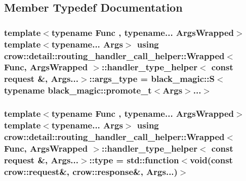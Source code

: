 \subsection{Member Typedef Documentation}
\hypertarget{structcrow_1_1detail_1_1routing__handler__call__helper_1_1_wrapped_1_1handler__type__helper_3_01176bac6491f2834cd36a05c30aa75bc3_ade60c2819ed613788645a5642e843725}{
\subsubsection[{args\-\_\-type}]{\setlength{\rightskip}{0pt plus 5cm}template$<$typename Func , typename... Args\-Wrapped$>$ template$<$typename... Args$>$ using {\bf crow\-::detail\-::routing\-\_\-handler\-\_\-call\-\_\-helper\-::\-Wrapped}$<$ Func, Args\-Wrapped $>$\-::{\bf handler\-\_\-type\-\_\-helper}$<$ const {\bf request} \&, Args...$>$\-::{\bf args\-\_\-type} =  {\bf black\-\_\-magic\-::\-S}$<$typename {\bf black\-\_\-magic\-::promote\-\_\-t}$<$Args$>$...$>$}}\label{structcrow_1_1detail_1_1routing__handler__call__helper_1_1_wrapped_1_1handler__type__helper_3_01176bac6491f2834cd36a05c30aa75bc3_ade60c2819ed613788645a5642e843725}
\hypertarget{structcrow_1_1detail_1_1routing__handler__call__helper_1_1_wrapped_1_1handler__type__helper_3_01176bac6491f2834cd36a05c30aa75bc3_a4254e7a313ab4c1364261c4c54d95319}{
\subsubsection[{type}]{\setlength{\rightskip}{0pt plus 5cm}template$<$typename Func , typename... Args\-Wrapped$>$ template$<$typename... Args$>$ using {\bf crow\-::detail\-::routing\-\_\-handler\-\_\-call\-\_\-helper\-::\-Wrapped}$<$ Func, Args\-Wrapped $>$\-::{\bf handler\-\_\-type\-\_\-helper}$<$ const {\bf request} \&, Args...$>$\-::{\bf type} =  std\-::function$<$void(const {\bf crow\-::request}\&, {\bf crow\-::response}\&, Args...)$>$}}\label{structcrow_1_1detail_1_1routing__handler__call__helper_1_1_wrapped_1_1handler__type__helper_3_01176bac6491f2834cd36a05c30aa75bc3_a4254e7a313ab4c1364261c4c54d95319}


